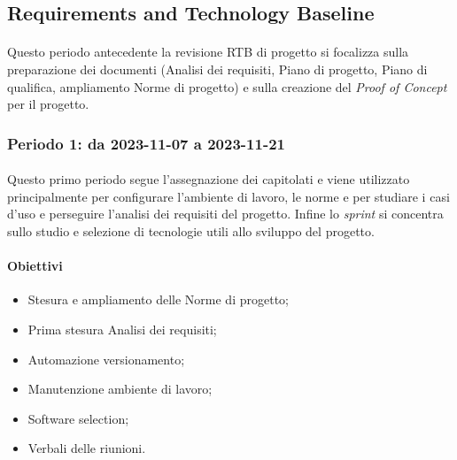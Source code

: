 \documentclass[10pt, a4paper]{article}
\begin{document}
{{{{{{{{\subsection{Requirements and Technology Baseline}
\paragraph{}Questo periodo antecedente la revisione RTB di progetto si focalizza sulla preparazione dei documenti (Analisi dei requisiti, Piano di progetto, Piano di qualifica, ampliamento Norme di progetto) e sulla creazione del \textit{Proof of Concept} per il progetto.
\subsubsection{Periodo 1: da 2023-11-07 a 2023-11-21}
\paragraph{}Questo primo periodo segue l'assegnazione dei capitolati e viene utilizzato principalmente per configurare l'ambiente di lavoro, le norme e per studiare i casi d'uso e perseguire l'analisi dei requisiti del progetto. Infine lo \textit{sprint} si concentra sullo studio e selezione di tecnologie utili allo sviluppo del progetto.
\paragraph{Obiettivi}
\begin{itemize}
    \item Stesura e ampliamento delle Norme di progetto;
    \item Prima stesura Analisi dei requisiti;
    \item Automazione versionamento;
    \item Manutenzione ambiente di lavoro;
    \item Software selection;
    \item Verbali delle riunioni.
        
\end{itemize}
\vspace{1em}

}}}}}}}}
\end{document}
